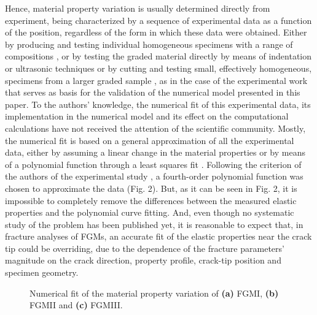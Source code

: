 Hence, material property variation is usually determined directly from experiment, being characterized by a sequence of experimental data as a function of the position, regardless of the form in which these data were obtained. Either by producing and testing individual homogeneous specimens with a range of compositions \citep{Carrillo-Heian2001,Jedamzik2000}, or by testing the graded material directly by means of indentation or ultrasonic techniques \citep{Krumova2001} or by cutting and testing small, effectively homogeneous, specimens from a larger graded sample \citep{Lambros1999,Rousseau2000,Butcher1999}, as in the case of the experimental work \citep{Abanto-Bueno2006} that serves as basis for the validation of the numerical model presented in this paper. To the authors' knowledge, the numerical fit of this experimental data, its implementation in the numerical model and its effect on the computational calculations have not received the attention of the scientific community. Mostly, the numerical fit is based on a general approximation of all the experimental data, either by assuming a linear change in the material properties \citep{Rousseau2000} or by means of a polynomial function through a least squares fit \citep{Oral2008b,Oral2008}. Following the criterion of the authors of the experimental study \citep{Oral2008b}, a fourth-order polynomial function was chosen to approximate the data (Fig. 2). But, as it can be seen in Fig. 2, it is impossible to completely remove the differences between the measured elastic properties and the polynomial curve fitting. And, even though no systematic study of the problem has been published yet, it is reasonable to expect that, in fracture analyses of FGMs, an accurate fit of the elastic properties near the crack tip could be overriding, due to the dependence of the fracture parameters' magnitude on the crack direction, property profile, crack-tip position and specimen geometry.

\begin{figure*}[!ht]
    \hfill
    
    \centering
    \caption{Numerical fit of the material property variation of \textbf{(a)} FGMI, \textbf{(b)} FGMII and \textbf{(c)} FGMIII.}
    \label{fig:Fig2}
\end{figure*}

